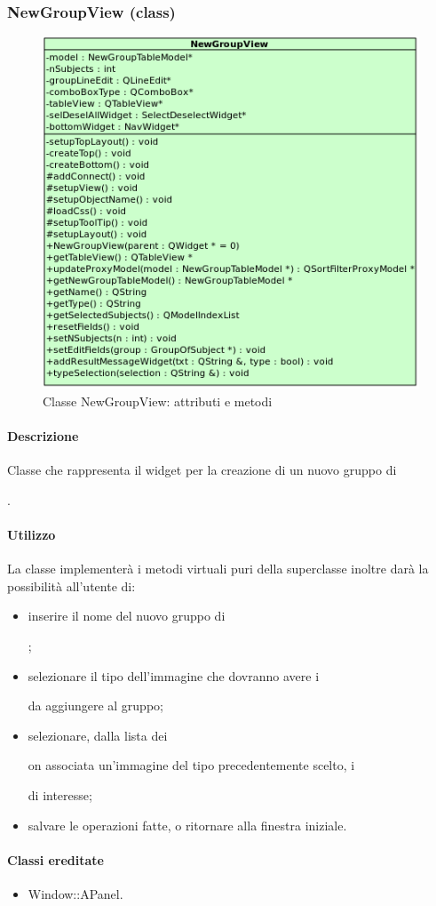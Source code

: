 \subsubsection{NewGroupView (class)}
\label{speNgroV}
\begin{figure}[!h]
\centering
			\includegraphics[width=0.6\linewidth]{./Content/Immagini/view/NewGroupView.png}
			\caption{Classe NewGroupView: attributi e metodi}
			\label{cl_ngro}
\end{figure}
\paragraph{Descrizione \\}
Classe che rappresenta il widget per la creazione di un nuovo gruppo di \subject{}.
\paragraph{Utilizzo\\}
La classe implementerà i metodi virtuali puri della superclasse inoltre darà la possibilità all'utente di:
\begin{itemize}
\item inserire il nome del nuovo gruppo di \subject{};
\item selezionare il tipo dell'immagine che dovranno avere i \subject{} da aggiungere al gruppo;
\item selezionare, dalla lista dei \subject con associata un'immagine del tipo precedentemente scelto, i \subject{} di interesse;
\item salvare le operazioni fatte, o ritornare alla finestra iniziale.
\end{itemize}
\paragraph{Classi ereditate\\}
\begin{itemize}
\item Window::APanel.
\end{itemize}
